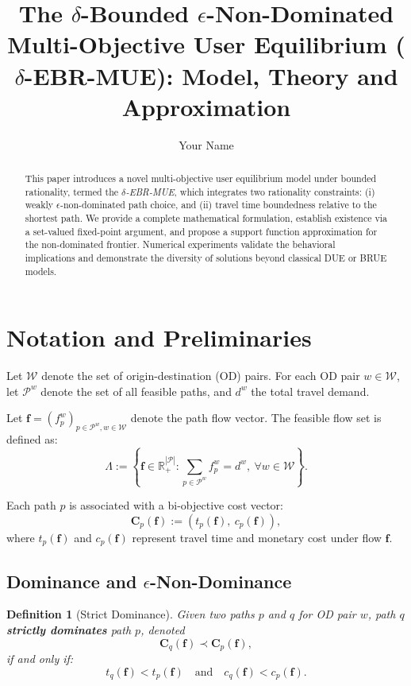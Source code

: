 \documentclass[11pt]{article}
\title{The \texorpdfstring{$\delta$}{delta}-Bounded \texorpdfstring{$\epsilon$}{epsilon}-Non-Dominated Multi-Objective User Equilibrium (\textbf{$\delta$-EBR-MUE}): Model, Theory and Approximation}
\author{Your Name}
\date{}
\newtheorem{definition}{Definition}[section]
\begin{document}
\maketitle

\begin{abstract}
This paper introduces a novel multi-objective user equilibrium model under bounded rationality, termed the \emph{$\delta$-EBR-MUE}, which integrates two rationality constraints: (i) weakly $\epsilon$-non-dominated path choice, and (ii) travel time boundedness relative to the shortest path. We provide a complete mathematical formulation, establish existence via a set-valued fixed-point argument, and propose a support function approximation for the non-dominated frontier. Numerical experiments validate the behavioral implications and demonstrate the diversity of solutions beyond classical DUE or BRUE models.
\end{abstract}

\section{Notation and Preliminaries}

Let $\mathcal{W}$ denote the set of origin-destination (OD) pairs. For each OD pair $w \in \mathcal{W}$, let $\mathcal{P}^w$ denote the set of all feasible paths, and $d^w$ the total travel demand.

Let $\mathbf{f} = (f_p^w)_{p \in \mathcal{P}^w, w \in \mathcal{W}}$ denote the path flow vector. The feasible flow set is defined as:
\[
\Lambda := \left\{ \mathbf{f} \in \mathbb{R}_+^{|\mathcal{P}|} : \sum_{p \in \mathcal{P}^w} f_p^w = d^w, \ \forall w \in \mathcal{W} \right\}.
\]

Each path $p$ is associated with a bi-objective cost vector:
\[
\mathbf{C}_p(\mathbf{f}) := \left(t_p(\mathbf{f}),\ c_p(\mathbf{f}) \right),
\]
where $t_p(\mathbf{f})$ and $c_p(\mathbf{f})$ represent travel time and monetary cost under flow $\mathbf{f}$.

\subsection*{Dominance and $\epsilon$-Non-Dominance}

\begin{definition}[Strict Dominance]
Given two paths $p$ and $q$ for OD pair $w$, path $q$ \textbf{strictly dominates} path $p$, denoted
\[
\mathbf{C}_q(\mathbf{f}) \prec \mathbf{C}_p(\mathbf{f}),
\]
if and only if:
\[
t_q(\mathbf{f}) < t_p(\mathbf{f}) \quad \text{and} \quad c_q(\mathbf{f}) < c_p(\mathbf{f}).
\]
\end{definition}
\end{document}
